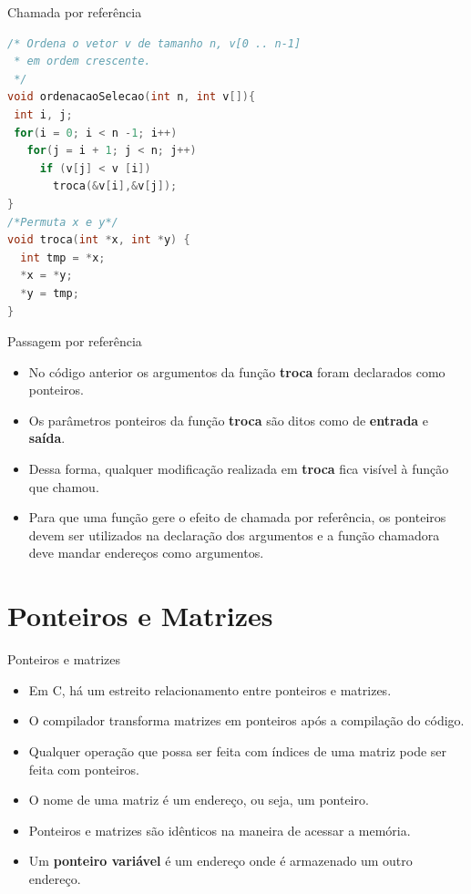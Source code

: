 \begin{frame}{Chamada por referência}
\begin{lstlisting}[language=C]
/* Ordena o vetor v de tamanho n, v[0 .. n-1] 
 * em ordem crescente.
 */
void ordenacaoSelecao(int n, int v[]){
 int i, j;
 for(i = 0; i < n -1; i++)
   for(j = i + 1; j < n; j++)
     if (v[j] < v [i])
       troca(&v[i],&v[j]); 
}
/*Permuta x e y*/
void troca(int *x, int *y) {
  int tmp = *x;
  *x = *y; 
  *y = tmp;
}
\end{lstlisting}
\end{frame}

\begin{frame}[c]{Passagem por referência}
\begin{itemize}
  \item No código anterior os argumentos da função \textbf{troca} foram declarados como ponteiros.
  \item Os parâmetros ponteiros da função \textbf{troca} são ditos como de \textbf{entrada} e \textbf{saída}. 
  \item Dessa forma, qualquer modificação realizada em \textbf{troca} fica visível à função que chamou.
  \item \alert{Para que uma função gere o efeito de chamada por referência, os ponteiros devem ser utilizados na declaração dos argumentos e a função chamadora deve mandar endereços como argumentos}.
\end{itemize}
\end{frame}

\section{Ponteiros e Matrizes}
\begin{frame}[c]{Ponteiros e matrizes}  
  \begin{itemize}[<+->]
    \item Em C, há um estreito relacionamento entre ponteiros e matrizes.
    \item O compilador transforma matrizes em ponteiros após a compilação do código.
    \item Qualquer operação que possa ser feita com índices de uma matriz pode ser feita com ponteiros.
    \item O nome de uma matriz é um endereço, ou seja, um ponteiro.
    \item Ponteiros e matrizes são idênticos na maneira de acessar a memória.
    \item Um \textbf{ponteiro variável} é um endereço onde é armazenado um outro endereço.
  \end{itemize}
\end{frame}

